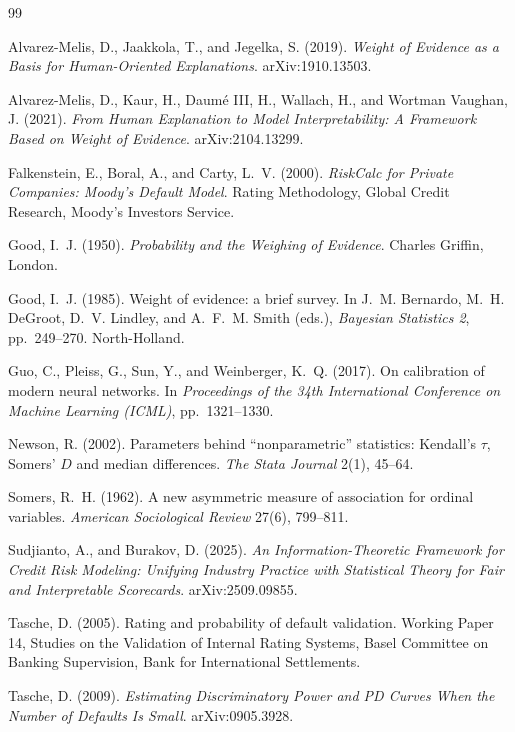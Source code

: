 \documentclass[12pt]{article}
\begin{document}
\begin{thebibliography}{99}
\setlength{\itemsep}{0.3em}

 Alvarez-Melis, D., Jaakkola, T., and Jegelka, S. (2019).
\emph{Weight of Evidence as a Basis for Human-Oriented Explanations}.
arXiv:1910.13503.

 Alvarez-Melis, D., Kaur, H., Daum\'e III, H., Wallach, H., and
Wortman Vaughan, J. (2021). \emph{From Human Explanation to Model Interpretability: A
Framework Based on Weight of Evidence}. arXiv:2104.13299.

 Falkenstein, E., Boral, A., and Carty, L.~V. (2000).
\emph{RiskCalc for Private Companies: Moody's Default Model}. Rating Methodology, Global
Credit Research, Moody's Investors Service.

 Good, I.~J. (1950). \emph{Probability and the Weighing of Evidence}.
Charles Griffin, London.

 Good, I.~J. (1985). Weight of evidence: a brief survey. In J.~M. Bernardo,
M.~H. DeGroot, D.~V. Lindley, and A.~F.~M. Smith (eds.), \emph{Bayesian Statistics 2},
pp.~249--270. North-Holland.

 Guo, C., Pleiss, G., Sun, Y., and Weinberger, K.~Q. (2017). On calibration
of modern neural networks. In \emph{Proceedings of the 34th International Conference on Machine
Learning (ICML)}, pp.~1321--1330.

 Newson, R. (2002). Parameters behind ``nonparametric'' statistics:
Kendall's $\tau$, Somers' $D$ and median differences. \emph{The Stata Journal} 2(1), 45--64.

 Somers, R.~H. (1962). A new asymmetric measure of association for
ordinal variables. \emph{American Sociological Review} 27(6), 799--811.

 Sudjianto, A., and Burakov, D. (2025). \emph{An Information-Theoretic
Framework for Credit Risk Modeling: Unifying Industry Practice with Statistical Theory for
Fair and Interpretable Scorecards}. arXiv:2509.09855.

 Tasche, D. (2005). Rating and probability of default validation. Working
Paper 14, Studies on the Validation of Internal Rating Systems, Basel Committee on Banking
Supervision, Bank for International Settlements.

 Tasche, D. (2009). \emph{Estimating Discriminatory Power and PD Curves
When the Number of Defaults Is Small}. arXiv:0905.3928.


\end{thebibliography}
\end{document}
